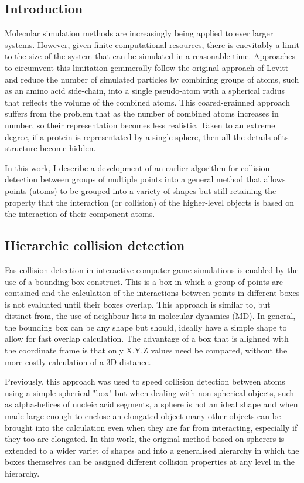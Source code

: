 \subsection{Introduction}

Molecular simulation methods are increasingly being applied to ever larger systems.
However, given finite computational resources, there is enevitably a limit to the
size of the system that can be simulated in a reasonable time.   Approaches to 
circumvent this limitation gemmerally follow the original approach of Levitt and
reduce the number of simulated particles by combining groups of atoms, such as an
amino acid side-chain, into a single pseudo-atom with a spherical radius that
reflects the volume of the combined atoms.
This coarsd-grainned approach suffers from the problem that as the number of combined
atoms increases in number, so their representation becomes less realistic.  Taken
to an extreme degree, if a protein is representated by a single sphere, then all 
the details ofits structure become hidden.  

In this work, I describe a development of an earlier algorithm for collision 
detection between groups of multiple points into a general method that allows
points (atoms) to be grouped into a variety of shapes but still retaining the 
property that the interaction (or collision) of the higher-level objects is based
on the interaction of their component atoms.

\subsection{Hierarchic collision detection}

Fas collision detection in interactive computer game simulations is enabled by the
use of a bounding-box construct.  This is a box in which a group of points are contained
and the calculation of the interactions between points in different boxes is not
evaluated until their boxes overlap.    This approach is similar to, but distinct from,
the use of neighbour-lists in molecular dynamics (MD).   In general, the bounding
box can be any shape but should, ideally have a simple shape to allow for fast
overlap calculation.    The advantage of a box that is alighned with the coordinate
frame is that only X,Y,Z values need be compared, without the more costly calculation
of a 3D distance.  

Previously, this approach was used to speed collision detection
between atoms using a simple spherical "box" but when dealing with non-spherical objects,
such as alpha-helices of nucleic acid segments, a sphere is not an ideal shape and
when made large enough to enclose an elongated object many other objects can be
brought into the calculation even when they are far from interacting, especially if
they too are elongated.   In this work, the original method based on spherers is
extended to a wider variet of shapes and into a generalised hierarchy in which the
boxes themselves can be assigned different collision properties at any level in the
hierarchy. 

